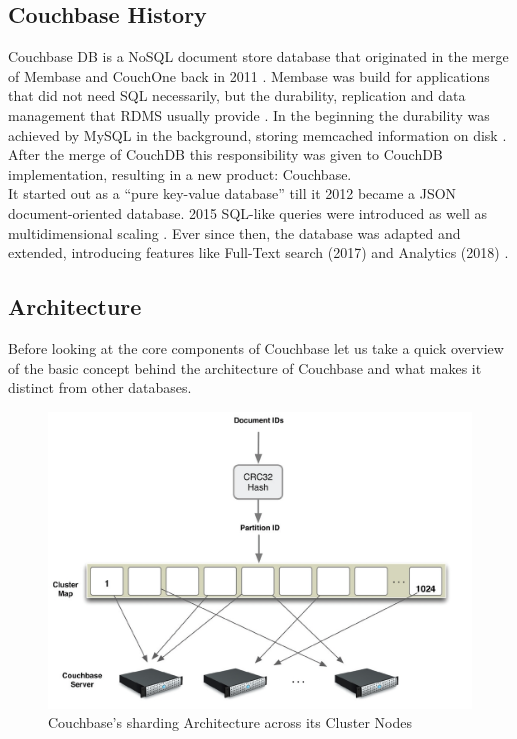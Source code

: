 \subsection{Couchbase History}
Couchbase DB is a NoSQL document store database that originated in the merge of Membase and CouchOne back in 2011 \parencite{couchbaseWeb}. Membase was build for applications that did not need SQL necessarily, but the durability, replication and data management that RDMS usually provide \parencite{ingenthron}. In the beginning the durability was achieved by MySQL in the background, storing memcached information on disk \parencite{popescuBacalu}. After the merge of CouchDB this responsibility was given to CouchDB implementation, resulting in a new product: Couchbase.\\
It started out as a “pure key-value database” \parencite{couchbaseAbout} till it 2012 became a JSON document-oriented database. 2015 SQL-like queries were introduced as well as multidimensional scaling \parencite{couchbaseAbout}. Ever since then, the database was adapted and extended, introducing features like Full-Text search (2017) and Analytics (2018) \parencite{couchbaseAbout}.

\subsection{Architecture}
Before looking at the core components of Couchbase let us take a quick overview of the basic concept behind the architecture of Couchbase and what makes it distinct from other databases.

\begin{figure}[H]
    \includegraphics[width=\textwidth]{img/couchbaseClusterMap.jpg}
    \caption{Couchbase's sharding Architecture across its Cluster Nodes}
    \label{figure:Architecture}
\end{figure}

